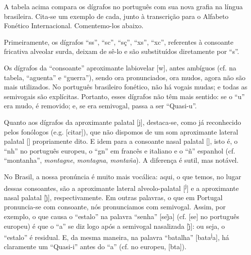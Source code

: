 \documentclass[12pt, a5paper, titlepage]{article}
\begin{document}
\PtTableDigraphs

A tabela acima compara os dígrafos no português com sua nova grafia na língua brasileira. Cita-se um exemplo de cada, junto à transcrição para o Alfabeto Fonético Internacional. Comentemo-los abaixo.

Primeiramente, os dígrafos ``ss'', ``sc'', ``sç'', ``xs'', ``xc'', referentes à consoante fricativa alveolar surda, deixam de sê-lo e são substituídos diretamente por ``s''.

Os dígrafos da ``consoante'' aproximante labiovelar [w], antes ambíguos (cf. na tabela,   ``aguenta'' e ``guerra''), sendo ora pronunciados, ora mudos, agora não são mais utilizados. No português brasileiro fonético, não há vogais mudas; e todas as semivogais são explícitas. Portanto, esses dígrafos não têm mais sentido: se o ``u'' era mudo, é removido; e, se era semivogal, passa a ser ``Quasi-u''.

Quanto aos dígrafos da aproximante palatal [j], destaca-se, como já reconhecido pelos fonólogos (e.g. [citar]), que não dispomos de um som aproximante lateral palatal [\textturny] propriamente dito. E idem para a consoante nasal palatal [\textltailn], isto é, o ``nh'' no português europeu, o ``gn'' em francês e italiano e o ``ñ'' espanhol (cf.
``montanha'', \textit{montagne}, \textit{montagna}, \textit{montaña}). A diferença é sutil, mas notável.

No Brasil, a nossa pronúncia é muito mais vocálica: aqui, o que temos, no lugar dessas consoantes, são a aproximante lateral alveolo-palatal [\textsuperscript{j}] e a aproximante nasal palatal [\~\j], respectivamente. Em outras palavras, o que em Portugal pronuncia-se com consoante, nós pronunciamos com semivogal.
Assim, por exemplo, o que causa o ``estalo'' na palavra ``senha'' [\textprimstress se\~\j a] (cf. [\textprimstress se\textltailn\textturna] no português europeu) é que o ``a'' se diz logo após a semivogal nasalizada [\~\j]: ou seja, o ``estalo'' é residual. E, da mesma maneira, na palavra ``batalha'' [ba\textprimstress ta{\textsuperscript{j}}a], há claramente um ``Quasi-i'' antes do ``a'' (cf. no europeu, [b\textturna\textprimstress ta\textturny\textturna]).
\end{document}
